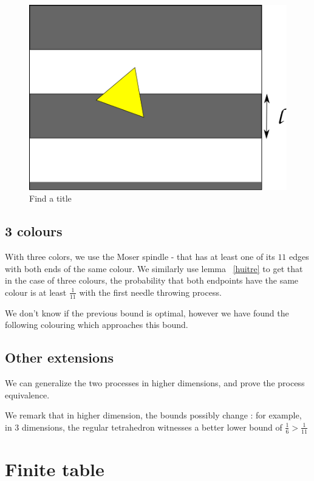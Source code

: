 \documentclass[a4paper,11pt]{article}
\theoremstyle{definition}
\theoremstyle{remark}
\begin{document}
\begin{figure}[h]\center
\includegraphics[scale=0.5]{path6509.png}
\caption{\label{étiquette} Find a title}
\flushleft
\end{figure}


\subsection{3 colours}

 With three colors, we use the Moser spindle - that has at least one of its $11$ edges with both ends of the same colour.
 We similarly use lemma ~\ref{huitre} to get that in the case of three colours,
 the probability that both endpoints have the same colour is at least $\frac{1}{11}$ with the first needle throwing process. 

We don't know if the previous bound is optimal, however we have found the
following colouring which approaches this bound.
  

\subsection{Other extensions}

We can generalize the two processes in higher dimensions, and prove the
process equivalence. %

We remark that in higher dimension, the bounds possibly change : for
example, in 3 dimensions, the regular tetrahedron witnesses a better lower bound
of $\frac 1 6 >\frac 1 {11}$   

\section{Finite table}
\end{document}
